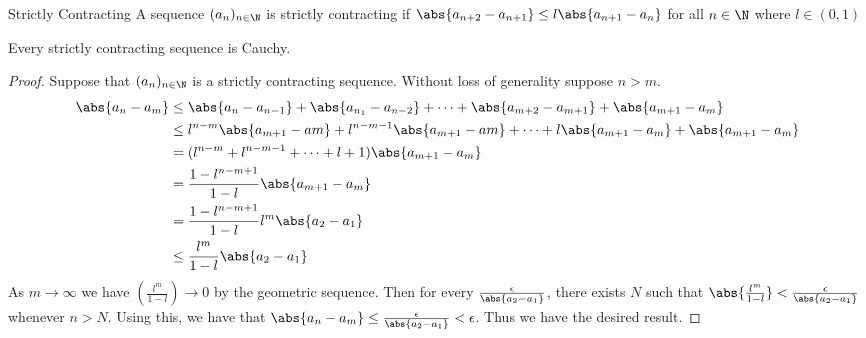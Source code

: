 \begin{defn}{Strictly Contracting}{} A sequence $(a_n)_{n\in\N}$ is strictly contracting if $\abs{a_{n+2}-a_{n+1}}\leq l\abs{a_{n+1}-a_n}$ for all $n\in\N$ where $l\in(0,1)$
\end{defn}

\begin{thm}{}{} Every strictly contracting sequence is Cauchy. \tcbline
\begin{proof} Suppose that $(a_n)_{n\in\N}$ is a strictly contracting sequence. Without loss of generality suppose $n>m$. 
\begin{align*}
\abs{a_n-a_m}&\leq\abs{a_n-a_{n-1}}+\abs{a_{n_1}-a_{n-2}}+\dots+\abs{a_{m+2}-a_{m+1}}+\abs{a_{m+1}-a_m} \\
&\leq l^{n-m}\abs{a_{m+1}-a{m}}+l^{n-m-1}\abs{a_{m+1}-a{m}}+\dots+l\abs{a_{m+1}-a_m}+\abs{a_{m+1}-a_m} \\
&=(l^{n-m}+l^{n-m-1}+\dots+l+1)\abs{a_{m+1}-a_m} \\
&=\frac{1-l^{n-m+1}}{1-l}\abs{a_{m+1}-a_m} \\
&=\frac{1-l^{n-m+1}}{1-l}l^m\abs{a_2-a_1} \\
&\leq\frac{l^m}{1-l}\abs{a_2-a_1}
\end{align*}
As $m\to\infty$ we have $\left(\frac{l^m}{1-l}\right)\to0$ by the geometric sequence. Then for every $\frac{\epsilon}{\abs{a_2-a_1}}$, there exists $N$ such that $\abs{\frac{l^m}{1-l}}<\frac{\epsilon}{\abs{a_2-a_1}}$ whenever $n>N$. Using this, we have that $\abs{a_n-a_m}\leq\frac{\epsilon}{\abs{a_2-a_1}}<\epsilon$. Thus we have the desired result. 
\end{proof}
\end{thm}

